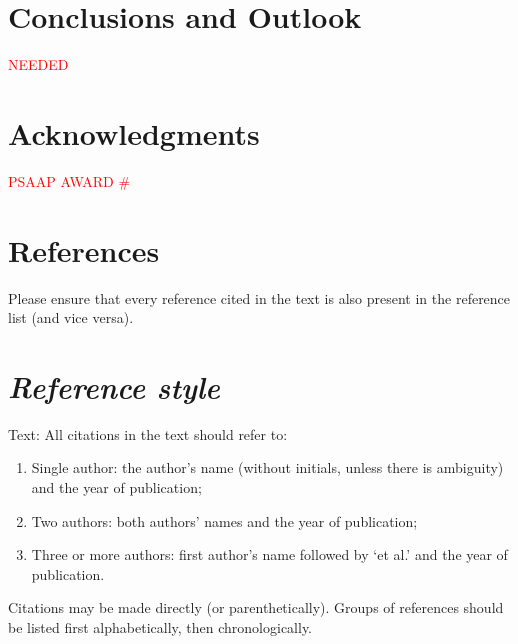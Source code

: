 \documentclass[times,final]{elsarticle}
\newcommand{\tcr}[1]{\textcolor{red}{#1}}
\begin{document}
\FloatBarrier
\section{Conclusions and Outlook}
\tcr{NEEDED}


\FloatBarrier
\section*{Acknowledgments}
\tcr{PSAAP AWARD \#}

\section*{References}

Please ensure that every reference cited in the text is also present in
the reference list (and vice versa).

\section*{\itshape Reference style}

Text: All citations in the text should refer to:
\begin{enumerate}
\item Single author: the author's name (without initials, unless there
is ambiguity) and the year of publication;
\item Two authors: both authors' names and the year of publication;
\item Three or more authors: first author's name followed by `et al.'
and the year of publication.
\end{enumerate}
Citations may be made directly (or parenthetically). Groups of
references should be listed first alphabetically, then chronologically.




\end{document}

